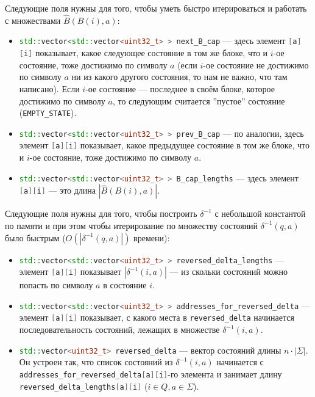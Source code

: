 \documentclass{article}
\begin{document}
Следующие поля нужны для того, чтобы уметь быстро итерироваться и работать с множествами $\hat B(B(i), a)$:
\begin{itemize}
  \item \lstinline[language=C++]!std::vector<std::vector<uint32_t> > next_B_cap! --- здесь элемент \lstinline[language=C++]![a][i]! показывает, какое следующее состояние в том же блоке, что и $i$-ое состояние, тоже достижимо по символу $a$ (если $i$-ое состояние не достижимо по символу $a$ ни из какого другого состояния, то нам не важно, что там написано). Если $i$-ое состояние --- последнее в своём блоке, которое достижимо по символу $a$, то следующим считается ''пустое'' состояние (\lstinline[language=C++]!EMPTY_STATE!).
  \item \lstinline[language=C++]!std::vector<std::vector<uint32_t> > prev_B_cap! --- по аналогии, здесь элемент \lstinline[language=C++]![a][i]! показывает, какое предыдущее состояние в том же блоке, что и $i$-ое состояние, тоже достижимо по символу $a$.
  \item \lstinline[language=C++]!std::vector<std::vector<uint32_t> > B_cap_lengths! --- здесь элемент \lstinline[language=C++]![a][i]! --- это длина $|\hat B(B(i), a)|$.
\end{itemize}
Следующие поля нужны для того, чтобы построить $\delta^{-1}$ с небольшой константой по памяти и при этом чтобы итерирование по множеству состояний $\delta^{-1}(q, a)$ было быстрым ($O(|\delta^{-1}(q, a)|)$ времени):
\begin{itemize}
  \item \lstinline[language=C++]!std::vector<std::vector<uint32_t> > reversed_delta_lengths! --- элемент \lstinline[language=C++]![a][i]! показывает $|\delta^{-1}(i, a)|$ --- из скольки состояний можно попасть по символу $a$ в состояние $i$.
  \item \lstinline[language=C++]!std::vector<std::vector<uint32_t> > addresses_for_reversed_delta! --- элемент \lstinline[language=C++]![a][i]! показывает, с какого места в \lstinline[language=C++]!reversed_delta! начинается последовательность состояний, лежащих в множестве $\delta^{-1}(i, a)$.
  \item \lstinline[language=C++]!std::vector<uint32_t> reversed_delta! --- вектор состояний длины $n \cdot |\Sigma|$. Он устроен так, что список состояний из $\delta^{-1}(i, a)$ начинается с \lstinline[language=C++]!addresses_for_reversed_delta[a][i]!-го элемента и занимает длину \lstinline[language=C++]!reversed_delta_lengths[a][i]! ($i \in Q, a \in \Sigma$).
\end{itemize}
\end{document}
